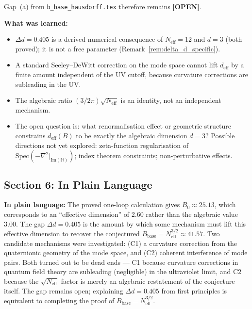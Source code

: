 \documentclass[11pt,a4paper]{article}
\theoremstyle{definition}
\theoremstyle{remark}
\begin{document}
Gap~(a) from \texttt{b\_base\_hausdorff.tex} therefore remains \textbf{[OPEN]}.

\medskip\noindent\textbf{What was learned:}
\begin{itemize}
  \item $\Delta d = 0.405$ is a derived numerical consequence of $N_{\mathrm{eff}} = 12$
    and $d = 3$ (both proved); it is not a free parameter
    (Remark~\ref{rem:delta_d_specific}).
  \item A standard Seeley--DeWitt correction on the mode space cannot lift
    $d_{\mathrm{eff}}$ by a finite amount independent of the UV cutoff,
    because curvature corrections are subleading in the UV.
  \item The algebraic ratio $(3/2\pi)\sqrt{N_{\mathrm{eff}}}$ is an identity,
    not an independent mechanism.
  \item The open question is: what renormalisation effect or geometric structure
    constrains $d_{\mathrm{eff}}(B)$ to be exactly the algebraic dimension $d = 3$?
    Possible directions not yet explored: zeta-function regularisation of
    $\mathrm{Spec}(-\nabla^2|_{\mathrm{Im}(\mathbb{H})})$;
    index theorem constraints; non-perturbative effects.
\end{itemize}

\subsection{Section 6: In Plain Language}
\label{sec:plain}

\textbf{In plain language:}
The proved one-loop calculation gives $B_0 \approx 25.13$, which corresponds to
an ``effective dimension'' of $2.60$ rather than the algebraic value $3.00$.
The gap $\Delta d = 0.405$ is the amount by which some mechanism must lift this
effective dimension to recover the conjectured $B_{\mathrm{base}} = N_{\mathrm{eff}}^{3/2} \approx 41.57$.
Two candidate mechanisms were investigated: (C1) a curvature correction from the
quaternionic geometry of the mode space, and (C2) coherent interference of mode pairs.
Both turned out to be dead ends — C1 because curvature corrections in quantum field
theory are subleading (negligible) in the ultraviolet limit, and C2 because the
$\sqrt{N_{\mathrm{eff}}}$ factor is merely an algebraic restatement of the conjecture itself.
The gap remains open; explaining $\Delta d = 0.405$ from first principles is
equivalent to completing the proof of $B_{\mathrm{base}} = N_{\mathrm{eff}}^{3/2}$.

\ifdefined\INCLUDEMODE\else
\end{document}
